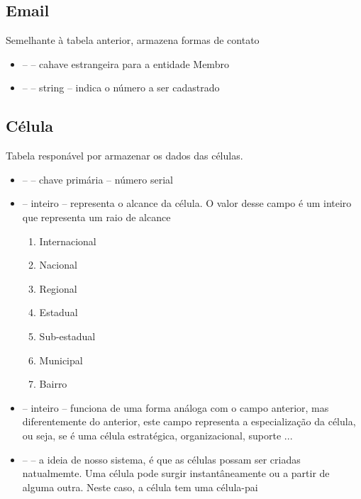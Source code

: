 \documentclass[11pt]{article}
\newcommand{\codigo}[3]{}
\begin{document}
        \subsection{Email}

            Semelhante à tabela anterior, armazena formas de contato
            \codigo{44}{53}{Email}
            \begin{itemize}
                \item \key \fk --  -- cahave estrangeira para a entidade Membro
                \item \key --  -- string -- indica o número a ser cadastrado
            \end{itemize}

        \subsection{Célula}

            Tabela responável por armazenar os dados das células.
            \codigo{55}{66}{Célula}
            \begin{itemize}
                \item \pk --  --  chave primária -- número serial
                \item {} -- inteiro --  representa o alcance da célula. O valor
                desse campo é um inteiro que representa um raio de alcance \begin{enumerate}
                    \item Internacional
                    \item Nacional
                    \item Regional
                    \item Estadual
                    \item Sub-estadual
                    \item Municipal
                    \item Bairro
                \end{enumerate}
                \item {} -- inteiro -- funciona de uma forma análoga com o campo anterior,
                mas diferentemente do anterior, este campo representa a especialização da célula, ou
                seja, se é uma célula estratégica, organizacional, suporte ...
                \item \fk --  -- a ideia de nosso sistema, é que as células possam
                ser criadas natualmemte. Uma célula pode surgir instantâneamente ou a partir de
                alguma outra. Neste caso, a célula tem uma célula-pai
            \end{itemize}
\end{document}
